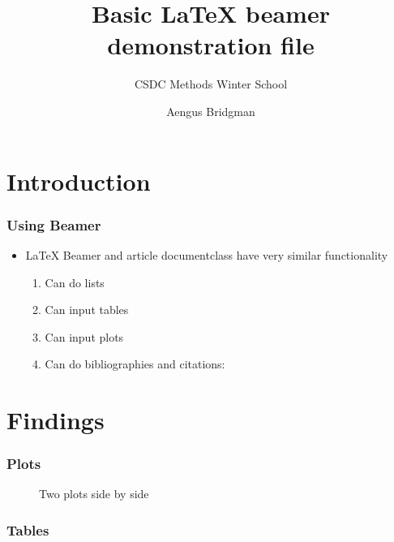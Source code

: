 \documentclass{beamer} %
\title{Basic LaTeX beamer demonstration file}
\subtitle{CSDC Methods Winter School}
\author{Aengus Bridgman}
\begin{document}
\frame{\titlepage} %

\section{Introduction} %

\begin{frame}
\frametitle{Using Beamer}

\begin{itemize} %
  \item LaTeX Beamer and article documentclass have very similar functionality
    \begin{enumerate} %
      \item Can do lists
      \item Can input tables
      \item Can input plots
      \item Can do bibliographies and citations: \parencite*{fox_package_2017}
    \end{enumerate}
\end{itemize}

\end{frame}

\section{Findings}

\begin{frame}
\frametitle{Plots}

\begin{figure}[h]
  \centering
  \qquad
  \caption{Two plots side by side}
\end{figure}

\end{frame}

\begin{frame}
	\frametitle{Tables}
    
\end{frame}

\end{document}
